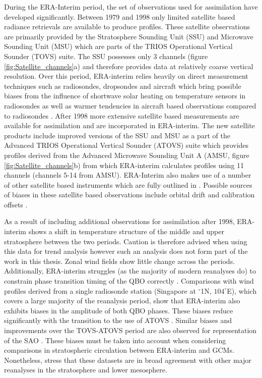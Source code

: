 During the ERA-Interim period, the set of observations used for assimilation have developed significantly. Between 1979 and 1998 only limited satellite based radiance retrievals are available to produce profiles. These satellite observations are primarily provided by the Stratosphere Sounding Unit (SSU) and Microwave Sounding Unit (MSU) which are parts of the TRIOS Operational Vertical Sounder (TOVS) suite. The SSU possesses only 3 channels (figure \ref{fig:Satellite_channels}a) and therefore provides data at relatively coarse vertical resolution. Over this period, ERA-interim relies heavily on direct measurement techniques such as radiosondes, dropsondes and aircraft \citep{fujiwaraIntroduction2017} which bring possible biases from the influence of shortwave solar heating on temperature sensors in radiosondes as well as warmer tendencies in aircraft based observations compared to radiosondes \citep{ballishSystematic2008}. After 1998 more extensive satellite based measurements are available for assimilation and are incorporated in ERA-interim. The new satellite products include improved versions of the SSU and MSU as a part of the Advanced TRIOS Operational Vertical Sounder (ATOVS) suite which provides profiles derived from the Advanced Microwave Sounding Unit A (AMSU, figure \ref{fig:Satellite_channels}b) from which ERA-interim calculates profiles using 11 channels (channels 5-14 from AMSU). ERA-Interim also makes use of a number of other satellite based instruments which are fully outlined in \citep{fujiwaraIntroduction2017}. Possible sources of biases in these satellite based observations include orbital drift and calibration offsets \citep{simmonsEstimating2014}.

As a result of including additional observations for assimilation after 1998, ERA-interim shows a shift in temperature structure of the middle and upper stratosphere between the two periods. Caution is therefore advised when using this data for trend analysis \citep{longClimatology2017} however such an analysis does not form part of the work in this thesis. Zonal wind fields show little change across the periods. Additionally, ERA-interim struggles (as the majority of modern reanalyses do) to constrain phase transition timing of the QBO correctly \citep{kawataniRepresentation2016}. Comparisons with wind profiles derived from a single radiosonde station (Singapore at $^{\circ}$1N, $104^{\circ}$E), which covers a large majority of the reanalysis period, show that ERA-interim also exhibits biases in the amplitude of both QBO phases. These biases reduce significantly with the transition to the use of ATOVS \citep{kawataniRepresentation2016,longClimatology2017}. Similar biases and improvements over the TOVS-ATOVS period are also observed for representation of the SAO \cite{baldwinTropical2005}. These biases must be taken into account when considering comparisons in stratospheric circulation between ERA-interim and GCMs. Nonetheless, \cite{longClimatology2017} stress that these datasets are in broad agreement with other major reanalyses in the stratosphere and lower mesosphere.


